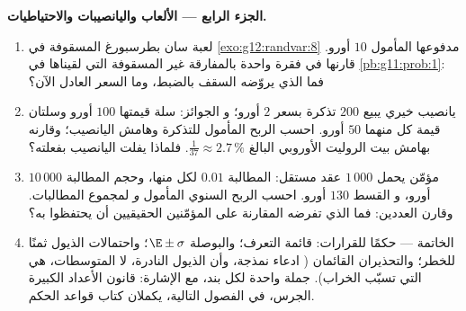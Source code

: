 \begin{problem}
\medskip
\noindent\textbf{الجزء الرابع --- الألعاب واليانصيبات والاحتياطيات.}
\begin{enumerate}[resume]
  \item لعبة سان بطرسبورغ المسقوفة في
        \cref{exo:g12:randvar:8} مدفوعها المأمول $10$
        أورو. قارنها في فقرة واحدة بالمفارقة غير المسقوفة
        التي لقيناها في \cref{pb:g11:prob:1}: فما الذي يروّضه
        السقف بالضبط، وما السعر العادل الآن؟
  \item يانصيب خيري يبيع $200$ تذكرة بسعر $2$ أورو؛ و
        الجوائز: سلة قيمتها $100$ أورو وسلتان قيمة كل منهما $50$ أورو.
        احسب الربح المأمول للتذكرة وهامش اليانصيب؛
        وقارنه بهامش بيت الروليت الأوروبي
        البالغ $\frac{1}{37} \approx 2.7\,\%$. فلماذا يفلت اليانصيب
        بفعلته؟
  \item مؤمّن يحمل $1\,000$ عقد مستقل:  المطالبة
        $0.01$ لكل منها، وحجم المطالبة $10\,000$ أورو، و
        القسط $130$ أورو. احسب الربح السنوي المأمول
        \emph{و}  لمجموع
        المطالبات. وقارن العددين: فما الذي تفرضه المقارنة
        على المؤمّنين الحقيقيين أن يحتفظوا به؟
  \item الخاتمة ---  حكمًا للقرارات:
        قائمة التعرف؛ والبوصلة $\E \pm \sigma$؛
        واحتمالات الذيول ثمنًا للخطر؛ والتحذيران القائمان
        ( ادعاء نمذجة، وأن الذيول
        النادرة، لا المتوسطات، هي التي تسبّب الخراب). جملة واحدة لكل بند،
        مع الإشارة: قانون الأعداد الكبيرة 
        الجرس، في الفصول التالية، يكملان كتاب قواعد الحكم.
\end{enumerate}
\end{problem}
